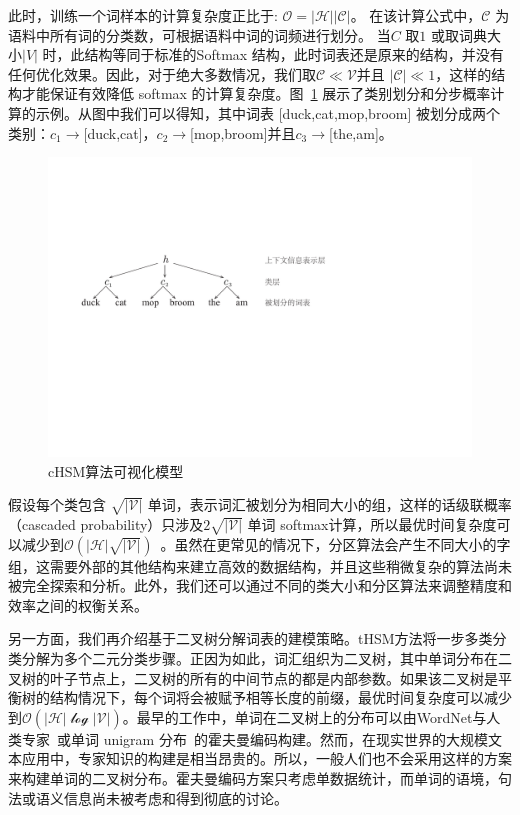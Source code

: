 此时，训练一个词样本的计算复杂度正比于: $\mathcal{O =|H||C|}$。 在该计算公式中，$\mathcal{C}$ 为语料中所有词的分类数，可根据语料中词的词频进行划分。 当$C$ 取$1$ 或取词典大小$|V|$ 时，此结构等同于标准的Softmax 结构，此时词表还是原来的结构，并没有任何优化效果。因此，对于绝大多数情况，我们取$\mathcal{C} \ll \mathcal{V}$并且 $|\mathcal{C}|\ll 1$，这样的结构才能保证有效降低 softmax 的计算复杂度。图~\ref{fig:case_hsm} 展示了类别划分和分步概率计算的示例。从图中我们可以得知，其中词表 [duck,cat,mop,broom] 被划分成两个类别：$c_1\to$[duck,cat]，$c_2\to$[mop,broom]并且$c_3\to$[the,am]。
\begin{figure}[!h]
  \centering
\includegraphics[width=0.79\linewidth]{./figures/case_chsm.pdf}
\caption{cHSM算法可视化模型}\label{fig:case_hsm}
\end{figure}

假设每个类包含 $\sqrt{\mathcal{|V|}}$ 单词，表示词汇被划分为相同大小的组，这样的话级联概率（cascaded probability）只涉及$2\sqrt{\mathcal{|V|}}$ 单词 softmax计算，所以最优时间复杂度可以减少到$\mathcal{O}(\mathcal{|H|}\sqrt{\mathcal{|V|}})$~。虽然在更常见的情况下，分区算法会产生不同大小的字组，这需要外部的其他结构来建立高效的数据结构，并且这些稍微复杂的算法尚未被完全探索和分析。此外，我们还可以通过不同的类大小和分区算法来调整精度和效率之间的权衡关系。

另一方面，我们再介绍基于二叉树分解词表的建模策略。tHSM方法将一步多类分类分解为多个二元分类步骤。正因为如此，词汇组织为二叉树，其中单词分布在二叉树的叶子节点上，二叉树的所有的中间节点的都是内部参数。如果该二叉树是平衡树的结构情况下，每个词将会被赋予相等长度的前缀，最优时间复杂度可以减少到$\mathcal{O(|H|\log \mathcal{|V|})}$。最早的工作中，单词在二叉树上的分布可以由WordNet与人类专家~或单词 unigram 分布~的霍夫曼编码构建。然而，在现实世界的大规模文本应用中，专家知识的构建是相当昂贵的。所以，一般人们也不会采用这样的方案来构建单词的二叉树分布。霍夫曼编码方案只考虑单数据统计，而单词的语境，句法或语义信息尚未被考虑和得到彻底的讨论。

